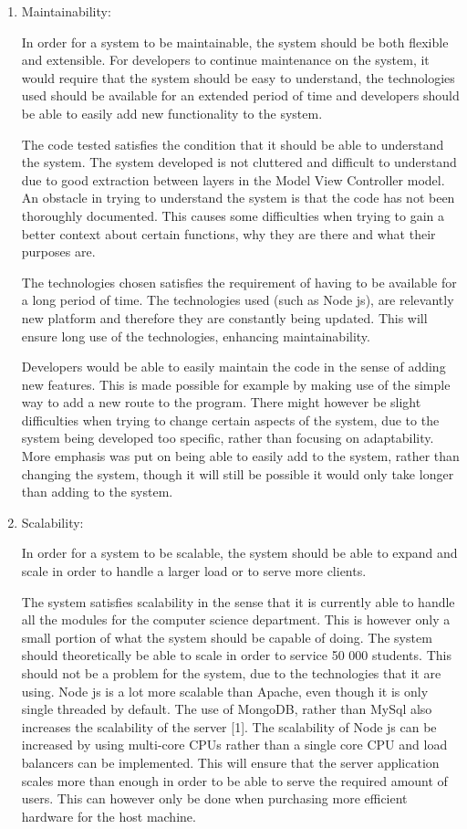 \documentclass[hidelinks, 12pt, oneside]{article}
\begin{document}
\begin{enumerate}
\item Maintainability: 

In order for a system to be maintainable, the system should be both flexible and extensible.  For developers to continue maintenance on the system, it would require that the system should be easy to understand, the technologies used should be available for an extended period of time and developers should be able to easily add new functionality to the system. 

The code tested satisfies the condition that it should be able to understand the system. The system developed is not cluttered and difficult to understand due to good extraction between layers in the Model View Controller model. An obstacle in trying to understand the system is that the code has not been thoroughly documented. This causes some difficulties when trying to gain a better context about certain functions, why they are there and what their purposes are.

The technologies chosen satisfies the requirement of having to be available for a long period of time. The technologies used (such as Node js), are relevantly new platform and therefore they are constantly being updated. This will ensure long use of the technologies, enhancing maintainability.

Developers would be able to easily maintain the code in the sense of adding new features. This is made possible for example by making use of the simple way to add a new route to the program. There might however be slight difficulties when trying to change certain aspects of the system, due to the system being developed too specific, rather than focusing on adaptability. More emphasis was put on being able to easily add to the system, rather than changing the system, though it will still be possible it would only take longer than adding to the system.

\item Scalability:

In order for a system to be scalable, the system should be able to expand and scale in order to handle a larger load or to serve more clients. 

The system satisfies scalability in the sense that it is currently able to handle all the modules for the computer science department. This is however only a small portion of what the system should be capable of doing. The system should theoretically be able to scale in order to service 50 000 students. This should not be a problem for the system, due to the technologies that it are using. Node js is a lot more scalable than Apache, even though it is only single threaded by default. The use of MongoDB, rather than MySql also increases the scalability of the server [1].  The scalability of Node js can be increased by using multi-core CPUs rather than a single core CPU and load balancers can be implemented. This will ensure that the server application scales more than enough in order to be able to serve the required amount of users. This can however only be done when purchasing more efficient hardware for the host machine. 


\end{enumerate}
\end{document}

